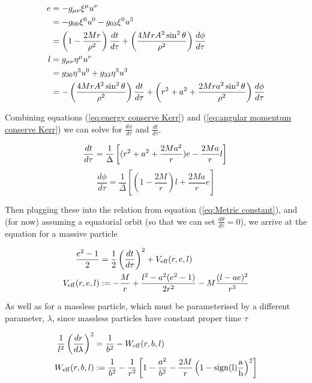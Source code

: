 \begin{alignat}{2}
    e  &= -g_{\mu \nu} \xi^{\mu} u^{\nu} \notag \\
       &= -g_{00}  \xi^0 u^0 - g_{03} \xi^0 u^3 \notag \\
       &= \left(1-\frac{2Mr}{\rho^2}\right) \frac{dt}{d\tau} + \left( \frac{4Mr A^2 \sin^2{\theta}}{\rho^2} \right)\frac{d\phi}{d\tau}  \label{eq:energy conserve Kerr} \\
    l &=g_{\mu \nu} \eta^{\mu} u^{\nu} \notag \\
      &= g_{30}  \eta^3 u^0 + g_{33} \eta^3 u^3 \notag \\
      &= - \left(\frac{4Mr A^2 \sin^2{\theta}}{\rho^2} \right) \frac{dt}{d\tau} + \left( r^2+a^2+\frac{2 M r a^2 \sin^2{\theta}}{\rho^2} \right) \frac{d\phi}{d\tau}
      \label{eq:angular momentum conserve Kerr}
\end{alignat}

Combining equations (\ref{eq:energy conserve Kerr}) and (\ref{eq:angular momentum conserve Kerr}) we can solve for $\frac{d\phi}{d\tau}$ and $\frac{dt}{d\tau}$.

\begin{equation}
    \frac{dt}{d\tau} =
        \frac{1}{\Delta}\left[(r^2+a^2+\frac{2 M a^2}{r}) e - \frac{2 M a}{r} l \right] \\
\end{equation}\label{eq:Kerr dtdtau}
\begin{equation}
    \frac{d\phi}{d\tau} =
        \frac{1}{\Delta} \left[ \left( 1-\frac{2 M}{r}
 \right) l+\frac{2 M a}{r} e \right]
\end{equation}\label{eq:Kerr dphidtau}

Then plugging these into the relation from equation (\ref{eq:Metric constant}), and (for now) assuming a equatorial orbit (so that we can set $\frac{d
\theta}{d\tau}=0$), we arrive at the equation for a massive particle

\begin{alignat}{2}
    \frac{e^2-1}{2} &= \frac{1}{2} \left(\frac{dt}{d\tau} \right)^2 + V_{\rm{eff}} (r, e, l) \\
    V_{\rm{eff}} (r, e, l) &:= - \frac{M}{r} + \frac{l^2 - a^2 (e^2-1)}{2 r^2} - M \frac{(l - a e)^2}{r^3}
\end{alignat}

As well as for a massless particle, which must be parameterised by a different parameter, $\lambda$, since massless particles have constant proper time $\tau$

\begin{alignat}{2}
    \frac{1}{l^2} \left( \frac{dr}{d\lambda} \right)^2 &= \frac{1}{b^2} - W_{\rm{eff}} (r, b, l) \\
    W_{\rm{eff}} (r, b, l) &:= \frac{1}{b^2} - \frac{1}{r^2} \left[  1-\frac{a^2}{b^2} -\frac{2M}{r} \left(  1-\rm{sign}(l) \frac{a}{b}   \right)^2  \right]
\end{alignat}

